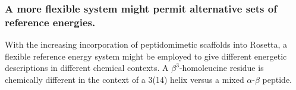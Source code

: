 \subsubsection{A more flexible system might permit alternative sets of reference energies.}
With the increasing incorporation of peptidomimetic scaffolds into Rosetta, a flexible reference energy system might be employed to give different energetic descriptions in different chemical contexts. A $\beta^3$-homoleucine residue is chemically different in the context of a 3(14) helix versus a mixed $\alpha$-$\beta$ peptide.
